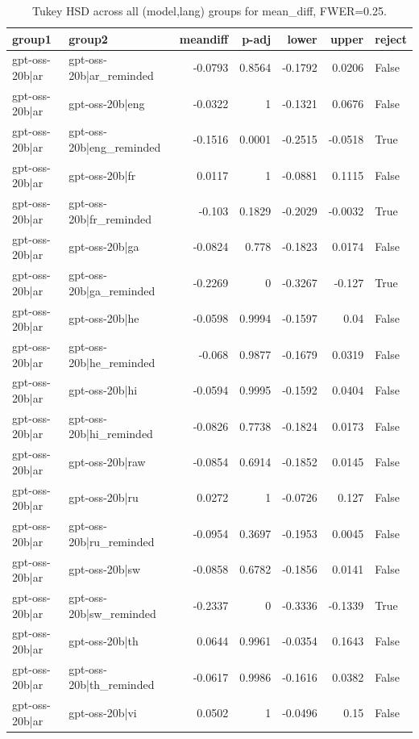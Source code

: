 \begin{table}
\caption{Tukey HSD across all (model,lang) groups for mean_diff, FWER=0.25.}
\label{tab:tukey_all_models_all_langs_mean_diff}
\begin{tabular}{l l r r r r l}
\toprule
group1 & group2 & meandiff & p-adj & lower & upper & reject \\
\midrule
gpt-oss-20b|ar & gpt-oss-20b|ar_reminded & -0.0793 & 0.8564 & -0.1792 & 0.0206 & False \\
gpt-oss-20b|ar & gpt-oss-20b|eng & -0.0322 & 1 & -0.1321 & 0.0676 & False \\
gpt-oss-20b|ar & gpt-oss-20b|eng_reminded & -0.1516 & 0.0001 & -0.2515 & -0.0518 & True \\
gpt-oss-20b|ar & gpt-oss-20b|fr & 0.0117 & 1 & -0.0881 & 0.1115 & False \\
gpt-oss-20b|ar & gpt-oss-20b|fr_reminded & -0.103 & 0.1829 & -0.2029 & -0.0032 & True \\
gpt-oss-20b|ar & gpt-oss-20b|ga & -0.0824 & 0.778 & -0.1823 & 0.0174 & False \\
gpt-oss-20b|ar & gpt-oss-20b|ga_reminded & -0.2269 & 0 & -0.3267 & -0.127 & True \\
gpt-oss-20b|ar & gpt-oss-20b|he & -0.0598 & 0.9994 & -0.1597 & 0.04 & False \\
gpt-oss-20b|ar & gpt-oss-20b|he_reminded & -0.068 & 0.9877 & -0.1679 & 0.0319 & False \\
gpt-oss-20b|ar & gpt-oss-20b|hi & -0.0594 & 0.9995 & -0.1592 & 0.0404 & False \\
gpt-oss-20b|ar & gpt-oss-20b|hi_reminded & -0.0826 & 0.7738 & -0.1824 & 0.0173 & False \\
gpt-oss-20b|ar & gpt-oss-20b|raw & -0.0854 & 0.6914 & -0.1852 & 0.0145 & False \\
gpt-oss-20b|ar & gpt-oss-20b|ru & 0.0272 & 1 & -0.0726 & 0.127 & False \\
gpt-oss-20b|ar & gpt-oss-20b|ru_reminded & -0.0954 & 0.3697 & -0.1953 & 0.0045 & False \\
gpt-oss-20b|ar & gpt-oss-20b|sw & -0.0858 & 0.6782 & -0.1856 & 0.0141 & False \\
gpt-oss-20b|ar & gpt-oss-20b|sw_reminded & -0.2337 & 0 & -0.3336 & -0.1339 & True \\
gpt-oss-20b|ar & gpt-oss-20b|th & 0.0644 & 0.9961 & -0.0354 & 0.1643 & False \\
gpt-oss-20b|ar & gpt-oss-20b|th_reminded & -0.0617 & 0.9986 & -0.1616 & 0.0382 & False \\
gpt-oss-20b|ar & gpt-oss-20b|vi & 0.0502 & 1 & -0.0496 & 0.15 & False \\

\end{tabular}
\end{table}
